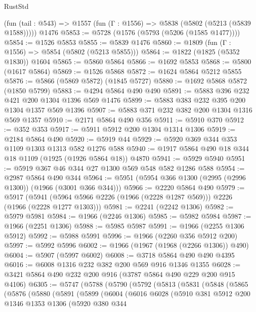 \begin{lexlean}{RustStd}
\begin{coremodule}
    (fun (tail : @543) => @1557 (fun (Γ : @1556) => @5838 (@5802 (@5213 (@5839 @1588)))))
    @1476
@5853 := @5728 (@1576 (@5793 (@5206 (@1585 @1477))))
@5854 := @1526 @5853
@5855 := @5839 @1476
@5860 := @1809 (fun (Γ : @1556) => @5854 (@5802 (@5213 @5855)))
@5864 := @1822 (@1825 (@5352 @1830)) @1604
@5865 := @5860 @5864
@5866 := @1692 @5853
@5868 := @5800 (@1617 @5864)
@5869 := @1526 @5868
@5872 := @1624 @5864 @5212 @5855
@5876 := @5866 (@5869 @5872) (@1845 @5727)
@5880 := @1692 @5868 @5872 (@1850 @5799)
@5883 := @4294 @5864 @490 @490
@5891 := @5883 @396 @232 @421 @200 @1304 @1396 @569 @1476
@5899 := @5883 @383 @232 @395 @200 @1304 @1357 @569 @1396
@5907 := @5883 @371 @232 @382 @200 @1304 @1316 @569 @1357
@5910 := @2171 @5864 @490 @356
@5911 := @5910 @370
@5912 := @352 @353
@5917 := @5911 @5912 @200 @1304 @1314 @1306
@5919 := @2184 @5864 @490
@5920 := @5919 @44
@5929 := @5920 @369 @344 @353 @1109 @1303 @1313 @582 @1276 @588
@5940 := @1917 @5864 @490 @18 @344 @18 @1109 (@1925 (@1926 @5864 @18)) @4870
@5941 := @5929 @5940
@5951 := @5919 @367 @46 @344 @27 @1300 @569 @548 @582 @1286 @588
@5954 := @2987 @5864 @490 @344
@5964 := @5951 (@5954 @366 @1300 (@2995 (@2996 @1300)) (@1966 (@3001 @366 @344)))
@5966 := @2220 @5864 @490
@5979 := @5917
    (@5941 (@5964 @5966 @2226 (@1966 (@2228 @1287 @569))) @2226 (@1966 (@2228 @1277 @1303)))
@5981 := @2241 (@2242 @1306)
@5982 := @5979 @5981
@5984 := @1966 (@2246 @1306)
@5985 := @5982 @5984
@5987 := @1966 (@2251 @1306)
@5988 := @5985 @5987
@5991 := @1966 (@2255 @1306 @5912)
@5992 := @5988 @5991
@5996 := @1966 (@2260 @356 @5912 @200)
@5997 := @5992 @5996
@6002 := @1966 (@1967 (@1968 (@2266 @1306)) @490)
@6004 := @5907 (@5997 @6002)
@6008 := @3718 @5864 @490 @490 @4395
@6016 := @6008 @1316 @232 @382 @200 @569 @916 @1346 @1355
@6028 := @3421 @5864 @490 @232 @200 @916 (@3787 @5864 @490 @229 @200 @915 @4106)
@6305 := @5747
    (@5788
      (@5790
        (@5792
          (@5813
            (@5831
              (@5848
                (@5865
                  (@5876
                    (@5880
                      (@5891
                        (@5899
                          (@6004
                            (@6016
                              @6028
                              (@5910
                                @381
                                @5912
                                @200
                                @1346
                                @1353
                                @1306
                                (@5920
                                  @380
                                  @344

\end{coremodule}
\end{lexlean}
